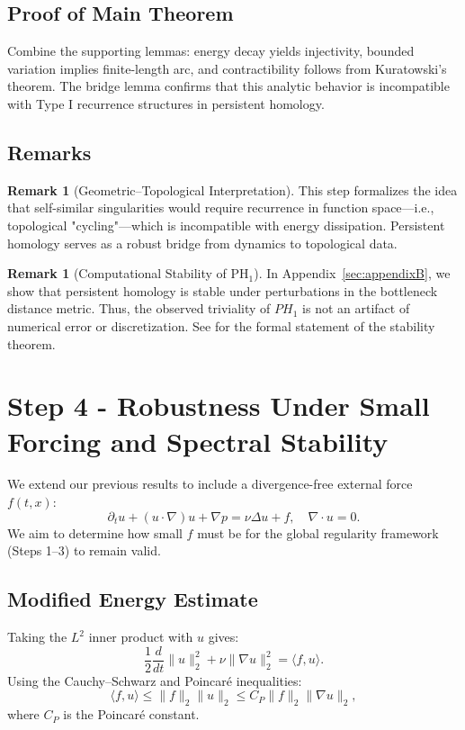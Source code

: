 \documentclass[11pt]{article}
\theoremstyle{definition}
\newtheorem{remark}[theorem]{Remark}
\begin{document}
\subsection*{Proof of Main Theorem}
Combine the supporting lemmas: energy decay yields injectivity, bounded variation implies finite-length arc, and contractibility follows from Kuratowski's theorem. The bridge lemma confirms that this analytic behavior is incompatible with Type I recurrence structures in persistent homology.

\subsection*{Remarks}
\begin{remark}[Geometric–Topological Interpretation]
This step formalizes the idea that self-similar singularities would require recurrence in function space—i.e., topological "cycling"—which is incompatible with energy dissipation. Persistent homology serves as a robust bridge from dynamics to topological data.
\end{remark}

\begin{remark}[Computational Stability of PH$_1$]
In Appendix~\ref{sec:appendixB}, we show that persistent homology is stable under perturbations in the bottleneck distance metric. Thus, the observed triviality of \( PH_1 \) is not an artifact of numerical error or discretization. See \cite{CohenSteiner2007} for the formal statement of the stability theorem.
\end{remark}


\section{Step 4 - Robustness Under Small Forcing and Spectral Stability}
\label{sec:step4}

We extend our previous results to include a divergence-free external force $f(t,x)$:
\[
\partial_t u + (u \cdot \nabla)u + \nabla p = \nu \Delta u + f,\quad \nabla \cdot u = 0.
\]
We aim to determine how small $f$ must be for the global regularity framework (Steps 1–3) to remain valid.

\subsection*{Modified Energy Estimate}
Taking the $L^2$ inner product with $u$ gives:
\[
\frac{1}{2} \frac{d}{dt} \|u\|_2^2 + \nu \|\nabla u\|_2^2 = \langle f, u \rangle.
\]
Using the Cauchy–Schwarz and Poincaré inequalities:
\[
\langle f, u \rangle \le \|f\|_2 \|u\|_2 \le C_P \|f\|_2 \|\nabla u\|_2,
\]
where $C_P$ is the Poincaré constant.
\end{document}
